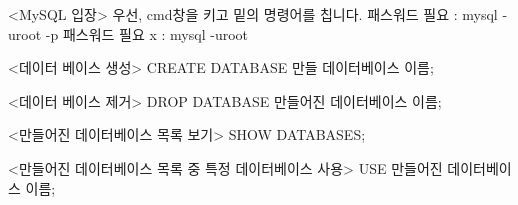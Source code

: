 <MySQL 입장>
우선, cmd창을 키고 밑의 명령어를 칩니다.
패스워드 필요 : mysql -uroot -p
패스워드 필요 x : mysql -uroot

<데이터 베이스 생성>
CREATE DATABASE 만들 데이터베이스 이름;

<데이터 베이스 제거>
DROP DATABASE 만들어진 데이터베이스 이름;

<만들어진 데이터베이스 목록 보기>
SHOW DATABASES;

<만들어진 데이터베이스 목록 중 특정 데이터베이스 사용>
USE 만들어진 데이터베이스 이름;

